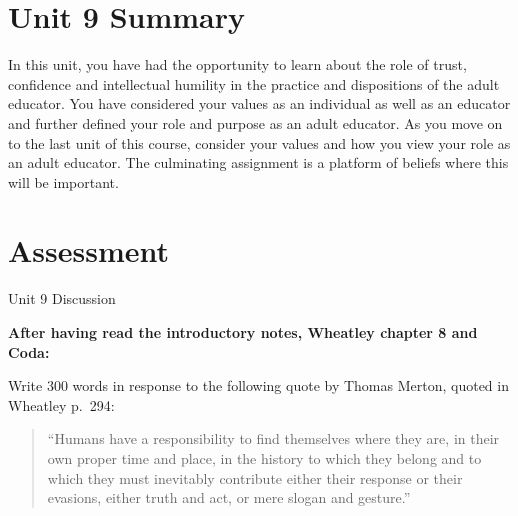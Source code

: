 \documentclass[
]{book}
\begin{document}
\hypertarget{unit-9-summary}{%
\section*{Unit 9 Summary}\label{unit-9-summary}}

In this unit, you have had the opportunity to learn about the role of trust, confidence and intellectual humility in the practice and dispositions of the adult educator. You have considered your values as an individual as well as an educator and further defined your role and purpose as an adult educator. As you move on to the last unit of this course, consider your values and how you view your role as an adult educator. The culminating assignment is a platform of beliefs where this will be important.

\hypertarget{assessment-8}{%
\section*{Assessment}\label{assessment-8}}

\begin{assessment}
{Unit 9 Discussion}

\textbf{After having read the introductory notes, Wheatley chapter 8 and Coda:}

Write 300 words in response to the following quote by Thomas Merton, quoted in Wheatley p.~294:

\begin{quote}
``Humans have a responsibility to find themselves where they are, in their own proper time and place, in the history to which they belong and to which they must inevitably contribute either their response or their evasions, either truth and act, or mere slogan and gesture.''
\end{quote}
\end{assessment}
\end{document}
